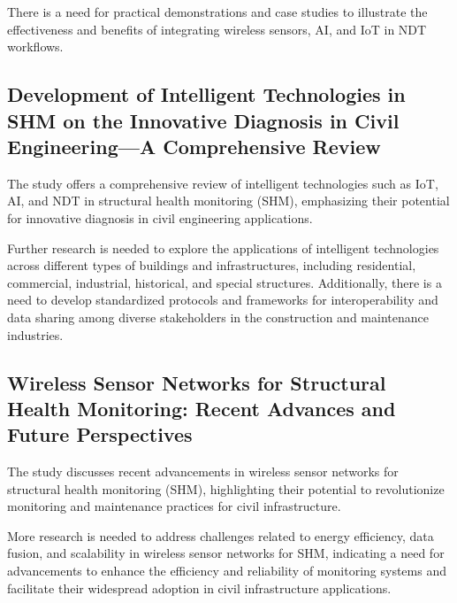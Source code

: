 \documentclass[journal, a4paper]{IEEEtran}
\begin{document}
\begin{description}[style=standard, font=\normalfont]
  \item[Research gap:] There is a need for practical demonstrations and case studies to illustrate the effectiveness and benefits of integrating wireless sensors, AI, and IoT in NDT workflows.
\end{description}

\subsection{Development of Intelligent Technologies in SHM on the Innovative Diagnosis in Civil Engineering—A Comprehensive Review} 
The study offers a comprehensive review of intelligent technologies such as IoT, AI, and NDT in structural health monitoring (SHM), emphasizing their potential for innovative diagnosis in civil engineering applications. 

\begin{description}[style=standard, font=\normalfont]
  \item[Research gap:] Further research is needed to explore the applications of intelligent technologies across different types of buildings and infrastructures, including residential, commercial, industrial, historical, and special structures. Additionally, there is a need to develop standardized protocols and frameworks for interoperability and data sharing among diverse stakeholders in the construction and maintenance industries.
\end{description}


\subsection{Wireless Sensor Networks for Structural Health Monitoring: Recent Advances and Future Perspectives}
The study discusses recent advancements in wireless sensor networks for structural health monitoring (SHM), highlighting their potential to revolutionize monitoring and maintenance practices for civil infrastructure.

\begin{description}[style=standard, font=\normalfont]
  \item[Research gap:] More research is needed to address challenges related to energy efficiency, data fusion, and scalability in wireless sensor networks for SHM, indicating a need for advancements to enhance the efficiency and reliability of monitoring systems and facilitate their widespread adoption in civil infrastructure applications. 
\end{description}
\end{document}
